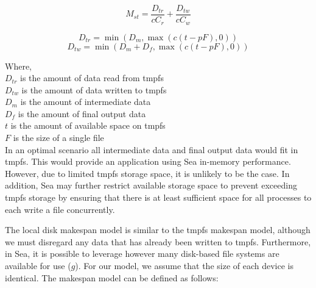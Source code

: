 \documentclass[10pt,journal,compsoc]{IEEEtran}
\begin{document}
      \begin{equation}\label{eq:sea-comp:mst}
          M_{st} = \frac{D_{tr}}{cC_{r}} + \frac{D_{tw}}{cC_{w}}
      \end{equation}

      \begin{equation*}\label{eq:sea-comp:dtr}
          D_{tr} = \min\left(D_{m}, \max{\left(c(t - pF), 0 \right)} \right)
      \end{equation*}
      \begin{equation*}\label{eq:sea-comp:dtw}
          D_{tw} = \min\left(D_{m} + D_{f}, \max{\left(c(t - pF), 0 \right)} \right)
      \end{equation*}

      Where,\\
      $D_{tr}$ is the amount of data read from tmpfs \\
      $D_{tw}$ is the amount of data written to tmpfs \\
      $D_{m}$ is the amount of intermediate data \\
      $D_{f}$ is the amount of final output data \\
      $t$ is the amount of available space on tmpfs \\
      $F$ is the size of a single file \\

      In an optimal scenario all intermediate data and final output data would
      fit in tmpfs. This would provide an application using Sea in-memory
      performance. However, due to limited tmpfs storage space, it is unlikely
      to be the case. In addition, Sea may further restrict available storage
      space to prevent exceeding tmpfs storage by ensuring that there is at
      least sufficient space for all processes to each write a file
      concurrently.

      The local disk  makespan model is similar to the tmpfs makespan model,
      although we must disregard any data that has already been
      written to tmpfs. Furthermore, in Sea, it is possible to leverage however
      many disk-based file systems are available for use ($g$). For our model,
      we assume that the size of each device is identical. The makespan model
      can be defined as follows:
\end{document}
